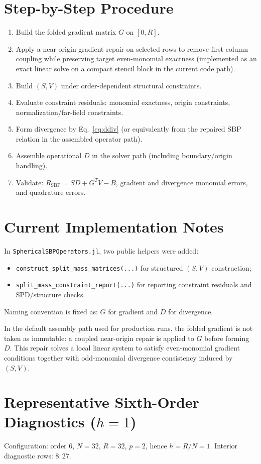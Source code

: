 \documentclass[
  aps,
  pre,
  reprint,
  superscriptaddress,
  nofootinbib
]{revtex4-2}
\newcommand{\Rsbp}{R_{\mathrm{SBP}}}
\begin{document}
\section{Step-by-Step Procedure}
\begin{enumerate}
  \item Build the folded gradient matrix $G$ on $[0,R]$.
  \item Apply a near-origin gradient repair on selected rows to remove first-column
  coupling while preserving target even-monomial exactness (implemented as an exact
  linear solve on a compact stencil block in the current code path).
  \item Build $(S,V)$ under order-dependent structural constraints.
  \item Evaluate constraint residuals:
  monomial exactness, origin constraints, normalization/far-field constraints.
  \item Form divergence by Eq.~\eqref{eq:ddiv} (or equivalently from the repaired
  SBP relation in the assembled operator path).
  \item Assemble operational $D$ in the solver path (including boundary/origin handling).
  \item Validate:
  $\Rsbp = SD+G^TV-B$, gradient and divergence monomial errors, and quadrature errors.
\end{enumerate}

\section{Current Implementation Notes}
In \texttt{SphericalSBPOperators.jl}, two public helpers were added:
\begin{itemize}
  \item \texttt{construct\_split\_mass\_matrices(...)} for structured $(S,V)$ construction;
  \item \texttt{split\_mass\_constraint\_report(...)} for reporting constraint residuals and SPD/structure checks.
\end{itemize}
Naming convention is fixed as:
$G$ for gradient and $D$ for divergence.

In the default assembly path used for production runs, the folded gradient is
not taken as immutable: a coupled near-origin repair is applied to $G$ before
forming $D$.
This repair solves a local linear system to satisfy even-monomial gradient
conditions together with odd-monomial divergence consistency induced by
$(S,V)$.

\section{Representative Sixth-Order Diagnostics (\texorpdfstring{$h=1$}{h=1})}
Configuration:
order $6$, $N=32$, $R=32$, $p=2$, hence $h=R/N=1$.
Interior diagnostic rows: $8:27$.
\end{document}
